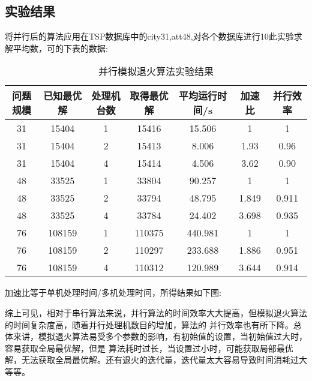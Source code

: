 \subsection{实验结果}
    将并行后的算法应用在TSP数据库中的city31,att48,对各个数据库进行10此实验求解平均数，可的下表的数据:
    \begin{table}[htbp]
    \centering  %
    \begin{tabular}{ccccccc}  %
    \hline
    问题规模&已知最优解&处理机台数&取得最优解&平均运行时间/s&加速比&并行效率\\ \hline 
    31&15404&1&15416&15.506&1&1\\        
    31&15404&2&15413&8.006&1.93&0.96\\        
    31&15404&4&15414&4.506&3.62&0.90\\        
    48&33525&1&33804&90.257&1&1\\        
    48&33525&2&33794&48.795&1.849&0.911\\        
    48&33525&4&33784&24.402&3.698&0.935\\        
    76&108159&1&110375&440.981&1&1\\        
    76&108159&2&110297&233.688&1.886&0.951\\        
    76&108159&4&110312&120.989&3.644&0.914\\        
    \end{tabular}
    \caption{并行模拟退火算法实验结果}
    \end{table}
    
    加速比等于单机处理时间/多机处理时间，所得结果如下图:

综上可见，相对于串行算法来说，并行算法的时间效率大大提高，但模拟退火算法的时间复杂度高，随着并行处理机数目的增加，算法的
并行效率也有所下降。总体来讲，模拟退火算法易受多个参数的影响，有初始值的设置，当初始值过大时，容易获取全局最优解，但是
算法耗时过长，当设置过小时，可能获取局部最优解，无法获取全局最优解。还有退火的迭代量，迭代量太大容易导致时间消耗过大等等。

